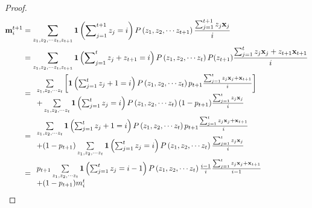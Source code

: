 \documentclass{article} \usepackage{iclr2019_conference,times}
\begin{document}
\begin{proof}



\begin{align}
{\bf m}^{t+1}_i & = \sum\limits_{{z_1},{z_2},\cdots{z_t},{z_{t + 1}}} {{\bf{1}}\left( {\sum\nolimits_{j = 1}^{t + 1} {{z_j} = i} } \right)P\left( {{z_1},{z_2},\cdots{z_{t + 1}}} \right)\frac{{\sum\nolimits_{j = 1}^{t + 1} {{z_j}{{\bf x}_j}} }}{i}}  \\
& = \sum\limits_{{z_1},{z_2},\cdots{z_t},{z_{t + 1}}} {{\bf{1}}\left( {\sum\nolimits_{j = 1}^t {{z_j} + {z_{t + 1}} = i} } \right)P\left( {{z_1},{z_2},\cdots{z_t}} \right)P({z_{t + 1}})\frac{{\sum\nolimits_{j = 1}^t {{z_j}{{\bf x}_j} + {z_{t + 1}}{{\bf x}_{t + 1}}} }}{i}}   \\
& = \begin{array}{l}
\sum\limits_{{z_1},{z_2},\cdots{z_t}} {\left[ {{\bf{1}}\left( {\sum\nolimits_{j = 1}^t {{z_j} + 1 = i} } \right)P\left( {{z_1},{z_2},\cdots{z_t}} \right){p_{t + 1}}\frac{{\sum\nolimits_{j = 1}^t {{z_j}{{\bf x}_j} + {{\bf x}_{t + 1}}} }}{i}} \right]} \\
 + \sum\limits_{{z_1},{z_2},\cdots{z_t}} {{\bf{1}}\left( {\sum\nolimits_{j = 1}^t {{z_j} = i} } \right)P\left( {{z_1},{z_2},\cdots{z_t}} \right)(1 - {p_{t + 1}})\frac{{\sum\nolimits_{j = 1}^t {{z_j}{{\bf x}_j}} }}{i}} 
\end{array} \\
& = \begin{array}{l}
  \sum\limits_{{z_1},{z_2},\cdots{z_t}} {{\bf{1}}\left( {\sum\nolimits_{j = 1}^t {{z_j} + 1 = i} } \right)P\left( {{z_1},{z_2},\cdots{z_t}} \right){p_{t + 1}}\frac{{\sum\nolimits_{j = 1}^t {{z_j}{{\bf x}_j} + {{\bf x}_{t + 1}}} }}{i}} \\
 + (1 - {p_{t + 1}})\sum\limits_{{z_1},{z_2},\cdots{z_t}} {{\bf{1}}\left( {\sum\nolimits_{j = 1}^t {{z_j} = i} } \right)P\left( {{z_1},{z_2},\cdots{z_t}} \right)\frac{{\sum\nolimits_{j = 1}^t {{z_j}{{\bf x}_j}} }}{i}} 
\end{array}\\
& =  \begin{array}{l}
{p_{t + 1}}\sum\limits_{{z_1},{z_2}, \cdots {z_t}} {{\bf{1}}\left( {\sum\nolimits_{j = 1}^t {{z_j} = i - 1} } \right)P\left( {{z_1},{z_2}, \cdots {z_t}} \right)\frac{{i - 1}}{i}\frac{{\sum\nolimits_{j = 1}^t {{z_j}{{\bf{x}}_j} + {{\bf{x}}_{t + 1}}} }}{{i - 1}}} \\
 + (1 - {p_{t + 1}})m_i^t
\end{array} \\

\end{align}
\end{proof}
\end{document}
